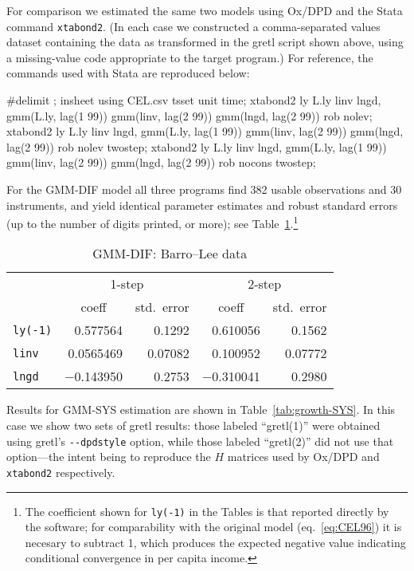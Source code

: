 For comparison we estimated the same two models using Ox/DPD and the
Stata command \texttt{xtabond2}. (In each case we constructed a
comma-separated values dataset containing the data as transformed in
the gretl script shown above, using a missing-value code appropriate
to the target program.) For reference, the commands used with
Stata are reproduced below:
%
\begin{code}
#delimit ;
insheet using CEL.csv
tsset unit time;
xtabond2 ly L.ly linv lngd, gmm(L.ly, lag(1 99)) gmm(linv, lag(2 99)) 
  gmm(lngd, lag(2 99)) rob nolev;
xtabond2 ly L.ly linv lngd, gmm(L.ly, lag(1 99)) gmm(linv, lag(2 99)) 
  gmm(lngd, lag(2 99)) rob nolev twostep;
xtabond2 ly L.ly linv lngd, gmm(L.ly, lag(1 99)) gmm(linv, lag(2 99)) 
  gmm(lngd, lag(2 99)) rob nocons twostep;
\end{code}

For the GMM-DIF model all three programs find 382 usable observations
and 30 instruments, and yield identical parameter estimates and
robust standard errors (up to the number of digits printed, or more);
see Table~\ref{tab:growth-DIF}.\footnote{The coefficient shown for
  \texttt{ly(-1)} in the Tables is that reported directly by the
  software; for comparability with the original model (eq.\
  \ref{eq:CEL96}) it is necesary to subtract 1, which produces the
  expected negative value indicating conditional convergence in per
  capita income.}

\begin{table}[htbp]
\begin{center}
\begin{tabular}{lrrrr}
& \multicolumn{2}{c}{1-step} & \multicolumn{2}{c}{2-step} \\
& \multicolumn{1}{c}{coeff} & \multicolumn{1}{c}{std.\ error} &
  \multicolumn{1}{c}{coeff} & \multicolumn{1}{c}{std.\ error} \\
\texttt{ly(-1)} & 0.577564 & 0.1292 & 0.610056 & 0.1562 \\
\texttt{linv} & 0.0565469 & 0.07082 & 0.100952 & 0.07772 \\
\texttt{lngd} & $-$0.143950 & 0.2753 & $-$0.310041 & 0.2980 \\
\end{tabular}
\caption{GMM-DIF: Barro--Lee data}
\label{tab:growth-DIF}
\end{center}
\end{table}

Results for GMM-SYS estimation are shown in
Table~\ref{tab:growth-SYS}. In this case we show two sets of gretl
results: those labeled ``gretl(1)'' were obtained using gretl's
\verb|--dpdstyle| option, while those labeled ``gretl(2)'' did not use
that option---the intent being to reproduce the $H$ matrices used by
Ox/DPD and \texttt{xtabond2} respectively.

